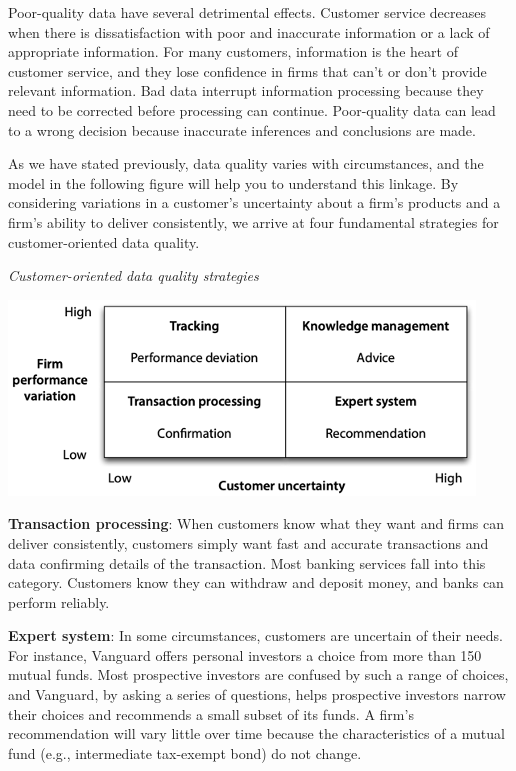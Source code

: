 \documentclass[
]{article}
\begin{document}
Poor-quality data have several detrimental effects. Customer service
decreases when there is dissatisfaction with poor and inaccurate
information or a lack of appropriate information. For many customers,
information is the heart of customer service, and they lose confidence
in firms that can't or don't provide relevant information. Bad data
interrupt information processing because they need to be corrected
before processing can continue. Poor-quality data can lead to a wrong
decision because inaccurate inferences and conclusions are made.

As we have stated previously, data quality varies with circumstances,
and the model in the following figure will help you to understand this
linkage. By considering variations in a customer's uncertainty about a
firm's products and a firm's ability to deliver consistently, we arrive
at four fundamental strategies for customer-oriented data quality.

\emph{Customer-oriented data quality strategies}

\includegraphics{Figures/Chapter 23/data-quality-strategies.png}

\textbf{Transaction processing}: When customers know what they want and firms
can deliver consistently, customers simply want fast and accurate
transactions and data confirming details of the transaction. Most
banking services fall into this category. Customers know they can
withdraw and deposit money, and banks can perform reliably.

\textbf{Expert system}: In some circumstances, customers are uncertain of
their needs. For instance, Vanguard offers personal investors a choice
from more than 150 mutual funds. Most prospective investors are confused
by such a range of choices, and Vanguard, by asking a series of
questions, helps prospective investors narrow their choices and
recommends a small subset of its funds. A firm's recommendation will
vary little over time because the characteristics of a mutual fund
(e.g., intermediate tax-exempt bond) do not change.
\end{document}
